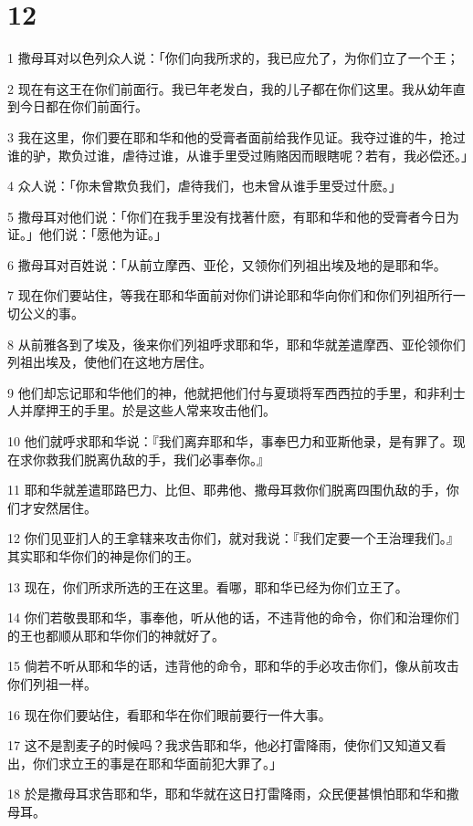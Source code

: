 \chapter{12}

\par 1 撒母耳对以色列众人说：「你们向我所求的，我已应允了，为你们立了一个王；
\par 2 现在有这王在你们前面行。我已年老发白，我的儿子都在你们这里。我从幼年直到今日都在你们前面行。
\par 3 我在这里，你们要在耶和华和他的受膏者面前给我作见证。我夺过谁的牛，抢过谁的驴，欺负过谁，虐待过谁，从谁手里受过贿赂因而眼瞎呢？若有，我必偿还。」
\par 4 众人说：「你未曾欺负我们，虐待我们，也未曾从谁手里受过什麽。」
\par 5 撒母耳对他们说：「你们在我手里没有找著什麽，有耶和华和他的受膏者今日为证。」他们说：「愿他为证。」
\par 6 撒母耳对百姓说：「从前立摩西、亚伦，又领你们列祖出埃及地的是耶和华。
\par 7 现在你们要站住，等我在耶和华面前对你们讲论耶和华向你们和你们列祖所行一切公义的事。
\par 8 从前雅各到了埃及，後来你们列祖呼求耶和华，耶和华就差遣摩西、亚伦领你们列祖出埃及，使他们在这地方居住。
\par 9 他们却忘记耶和华他们的神，他就把他们付与夏琐将军西西拉的手里，和非利士人并摩押王的手里。於是这些人常来攻击他们。
\par 10 他们就呼求耶和华说：『我们离弃耶和华，事奉巴力和亚斯他录，是有罪了。现在求你救我们脱离仇敌的手，我们必事奉你。』
\par 11 耶和华就差遣耶路巴力、比但、耶弗他、撒母耳救你们脱离四围仇敌的手，你们才安然居住。
\par 12 你们见亚扪人的王拿辖来攻击你们，就对我说：『我们定要一个王治理我们。』其实耶和华你们的神是你们的王。
\par 13 现在，你们所求所选的王在这里。看哪，耶和华已经为你们立王了。
\par 14 你们若敬畏耶和华，事奉他，听从他的话，不违背他的命令，你们和治理你们的王也都顺从耶和华你们的神就好了。
\par 15 倘若不听从耶和华的话，违背他的命令，耶和华的手必攻击你们，像从前攻击你们列祖一样。
\par 16 现在你们要站住，看耶和华在你们眼前要行一件大事。
\par 17 这不是割麦子的时候吗？我求告耶和华，他必打雷降雨，使你们又知道又看出，你们求立王的事是在耶和华面前犯大罪了。」
\par 18 於是撒母耳求告耶和华，耶和华就在这日打雷降雨，众民便甚惧怕耶和华和撒母耳。

